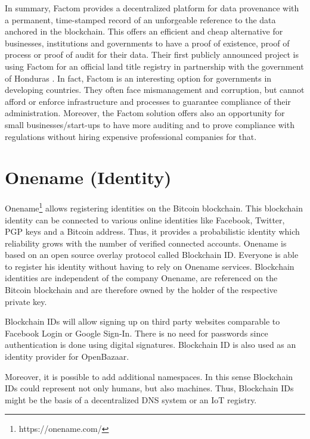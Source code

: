 {In summary, Factom provides a decentralized platform for data provenance with a 
permanent, time-stamped record of an unforgeable reference to the data anchored 
in the blockchain. This offers an efficient and cheap alternative for businesses, 
institutions and governments to have a proof of existence, proof of process or 
proof of audit for their data. Their first publicly announced project is using 
Factom for an official land title registry in partnership with the government of 
Honduras \parencite{Chavez2015}. In fact, Factom is an interesting option for 
governments in developing countries. They often face mismanagement and corruption, 
but cannot afford or enforce infrastructure and processes to guarantee compliance 
of their administration. Moreover, the Factom solution offers also an opportunity 
for small businesses/start-ups to have more auditing and to prove compliance with 
regulations without hiring expensive professional companies for that.

\section{Onename (Identity)}
\label{sec:ecoonename}

Onename\footnote{https://onename.com/} allows registering identities on the Bitcoin blockchain. This blockchain 
identity can be connected to various online identities like Facebook, Twitter, 
PGP keys and a Bitcoin address. Thus, it provides a probabilistic identity which 
reliability grows with the number of verified connected accounts. Onename is based 
on an open source overlay protocol called Blockchain ID. Everyone is able to register 
his identity without having to rely on Onename services. Blockchain identities 
are independent of the company Onename, are referenced on the Bitcoin blockchain 
and are therefore owned by the holder of the respective private key.

Blockchain IDs will allow signing up on third party websites comparable to Facebook 
Login or Google Sign-In. There is no need for passwords since authentication is 
done using digital signatures. Blockchain ID is also used as an identity provider 
for OpenBazaar. 

Moreover, it is possible to add additional namespaces. In this sense Blockchain 
IDs could represent not only humans, but also machines. Thus, Blockchain IDs might 
be the basis of a decentralized DNS system or an IoT registry. 

}
